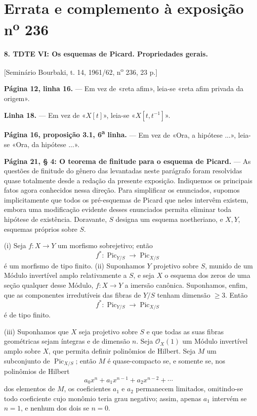 \clearpage
\chapter*{Errata e complemento à exposição n\textsuperscript{o} 236}

\noindent\textbf{8. TDTE VI: Os esquemas de Picard. Propriedades gerais.}

\begin{center}
[Seminário Bourbaki, t. 14, 1961/62, n\textsuperscript{o} 236, 23 p.]
\end{center}

\noindent\textbf{Página 12, linha 16.} --- Em vez de «reta afim», leia-se
«reta afim privada da origem».

\noindent\textbf{Linha 18.} --- Em vez de «$X[t]$», leia-se
«$X[t,t^{-1}]$».

\noindent\textbf{Página 16, proposição 3.1, 6\textsuperscript{a} linha.} ---
Em vez de «Ora, a hipótese ...», leia-se «Ora, da hipótese ...».

\noindent\textbf{Página 21, § 4: O teorema de finitude para o esquema de
Picard.} --- As questões de finitude do gênero das levantadas neste parágrafo
foram resolvidas quase totalmente desde a redação da presente exposição.
Indiquemos os principais fatos agora conhecidos nessa direção. Para simplificar
os enunciados, supomos implicitamente que todos os pré-esquemas de Picard que
neles intervêm existem, embora uma modificação evidente desses enunciados
permita eliminar toda hipótese de existência. Doravante, $S$ designa um esquema
noetheriano, e $X,Y$, esquemas próprios sobre $S$.

\medskip
\noindent(i) Seja $f:X\longrightarrow Y$ um morfismo sobrejetivo; então
\[
f^*: \operatorname{Pic}_{Y/S}\longrightarrow\operatorname{Pic}_{X/S}
\]
é um morfismo de tipo finito.
\noindent(ii) Suponhamos $Y$ projetivo sobre $S$, munido de um Módulo
invertível amplo relativamente a $S$, e seja $X$ o esquema dos zeros de uma
seção qualquer desse Módulo, $f:X\longrightarrow Y$ a imersão canônica.
Suponhamos, enfim, que as componentes irredutíveis das fibras de $Y/S$ tenham
dimensão $\geq3$. Então
\[
f^*: \operatorname{Pic}_{Y/S}\longrightarrow\operatorname{Pic}_{X/S}
\]
é de tipo finito.

\noindent(iii) Suponhamos que $X$ seja projetivo sobre $S$ e que todas as suas
fibras geométricas sejam íntegras e de dimensão $n$. Seja
$\mathcal O_X(1)$ um Módulo invertível amplo sobre $X$, que permita definir
polinômios de Hilbert. Seja $M$ um subconjunto de
$\operatorname{Pic}_{X/S}$; então $M$ é quase-compacto se, e somente se, nos
polinômios de Hilbert
\[
a_0x^n+a_1x^{n-1}+a_2x^{n-2}+\cdots
\]
dos elementos de $M$, os coeficientes $a_1$ e $a_2$ permanecem limitados, omitindo-se todo coeficiente cujo monômio teria grau negativo; assim, apenas $a_1$ intervém se $n=1$, e nenhum dos dois se $n=0$.

